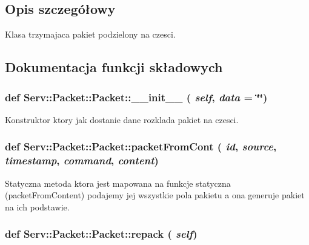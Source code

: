 \subsection{Opis szczegółowy}
\begin{DoxyVerb}Klasa trzymajaca pakiet podzielony na czesci.\end{DoxyVerb}
 

\subsection{Dokumentacja funkcji składowych}
\hypertarget{class_serv_1_1_packet_1_1_packet_a1f71ef65b348c86a047c87abe9ca2775}{
\subsubsection[{\_\-\_\-init\_\-\_\-}]{\setlength{\rightskip}{0pt plus 5cm}def Serv::Packet::Packet::\_\-\_\-init\_\-\_\- ( {\em self}, \/   {\em data} = {\ttfamily \char`\"{}\char`\"{}})}}
\label{class_serv_1_1_packet_1_1_packet_a1f71ef65b348c86a047c87abe9ca2775}
\begin{DoxyVerb}Konstruktor ktory jak dostanie dane rozklada pakiet na czesci.\end{DoxyVerb}
 \hypertarget{class_serv_1_1_packet_1_1_packet_a393243697bc1e23d5adadc50698fccd1}{
\subsubsection[{packetFromCont}]{\setlength{\rightskip}{0pt plus 5cm}def Serv::Packet::Packet::packetFromCont ( {\em id}, \/   {\em source}, \/   {\em timestamp}, \/   {\em command}, \/   {\em content})}}
\label{class_serv_1_1_packet_1_1_packet_a393243697bc1e23d5adadc50698fccd1}
\begin{DoxyVerb}Statyczna metoda ktora jest mapowana na funkcje statyczna (packetFromContent)
podajemy jej wszystkie pola pakietu a ona generuje pakiet na ich podstawie.
\end{DoxyVerb}
 \hypertarget{class_serv_1_1_packet_1_1_packet_a6dab330b602405f42b3fe090863e5c1e}{
\subsubsection[{repack}]{\setlength{\rightskip}{0pt plus 5cm}def Serv::Packet::Packet::repack ( {\em self})}}
